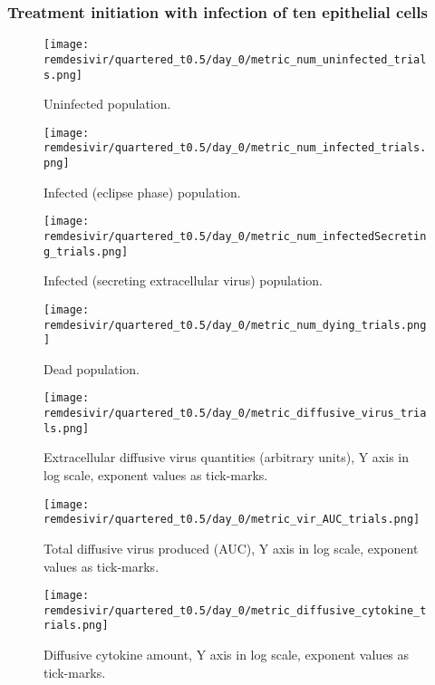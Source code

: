 \subsubsection{Treatment initiation with infection of ten epithelial cells}\label{sup:sec:extra_figures:homo_quartered:day0}

\begin{figure}[H]
\texttt{[image: remdesivir/quartered\_t0.5/day\_0/metric\_num\_uninfected\_trials.png]}
\caption{Uninfected population.\label{fig:app:homo_quartered:day0:uninf}}
\end{figure}

\begin{figure}[H]
\texttt{[image: remdesivir/quartered\_t0.5/day\_0/metric\_num\_infected\_trials.png]}
\caption{Infected (eclipse phase) population.\label{fig:app:homo_quartered:day0:inf}}
\end{figure}

\begin{figure}[H]
\texttt{[image: remdesivir/quartered\_t0.5/day\_0/metric\_num\_infectedSecreting\_trials.png]}
\caption{Infected (secreting extracellular virus) population.\label{fig:app:homo_quartered:day0:infSecr}}
\end{figure}

\begin{figure}[H]
\texttt{[image: remdesivir/quartered\_t0.5/day\_0/metric\_num\_dying\_trials.png]}
\caption{Dead population.\label{fig:app:homo_quartered:day0:dead}}
\end{figure}

\begin{figure}[H]
\texttt{[image: remdesivir/quartered\_t0.5/day\_0/metric\_diffusive\_virus\_trials.png]}
\caption{Extracellular diffusive virus quantities (arbitrary units), Y axis in log scale, exponent values as tick-marks.\label{fig:app:homo_quartered:day0:diff_vir}}
\end{figure}


\begin{figure}[H]
\texttt{[image: remdesivir/quartered\_t0.5/day\_0/metric\_vir\_AUC\_trials.png]}
\caption{Total diffusive virus produced (AUC), Y axis in log scale, exponent values as tick-marks.\label{fig:app:homo_quartered:day0:auc_vir}}
\end{figure}



\begin{figure}[H]
\texttt{[image: remdesivir/quartered\_t0.5/day\_0/metric\_diffusive\_cytokine\_trials.png]}
\caption{Diffusive cytokine amount, Y axis in log scale, exponent values as tick-marks.\label{fig:app:homo_quartered:day0:diff_cyto}}
\end{figure}

